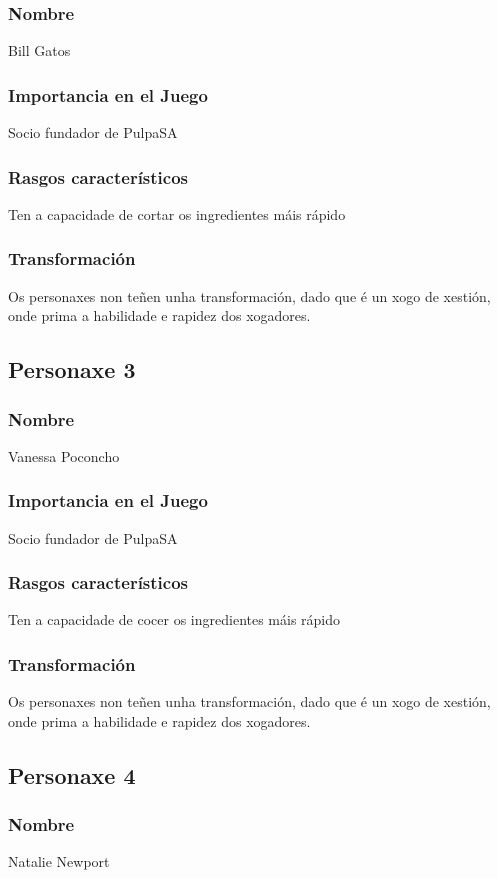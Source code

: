 \documentclass{report}  %
\begin{document}
\subsubsection{Nombre}
Bill Gatos
\subsubsection{Importancia en el Juego}
Socio fundador de PulpaSA \footnotemark[1]
\subsubsection{Rasgos característicos}
Ten a capacidade de cortar os ingredientes máis rápido \footnotemark[2]
\subsubsection{Transformación}
Os personaxes non teñen unha transformación, dado que é un xogo de xestión, onde prima a habilidade e rapidez dos xogadores.


\subsection{Personaxe 3}
\subsubsection{Nombre}
Vanessa Poconcho
\subsubsection{Importancia en el Juego}
Socio fundador de PulpaSA \footnotemark[1]

\subsubsection{Rasgos característicos}
Ten a capacidade de cocer os ingredientes máis rápido \footnotemark[2]
\subsubsection{Transformación}
Os personaxes non teñen unha transformación, dado que é un xogo de xestión, onde prima a habilidade e rapidez dos xogadores.


\subsection{Personaxe 4}
\subsubsection{Nombre}
Natalie Newport
\end{document}
